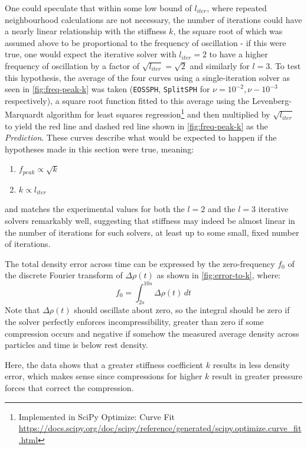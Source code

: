 One could speculate that within some low bound of $l_{iter}$, where repeated neighbourhood calculations are not necessary, the number of iterations could have a nearly linear relationship with the stiffness $k$, the square root of which was assumed above to be proportional to the frequency of oscillation - if this were true, one would expect the iterative solver with $l_{iter}=2$ to have a higher frequency of oscillation by a factor of $\sqrt{l_{iter}}=\sqrt{2}$ and similarly for $l=3$.
To test this hypothesis, the average of the four curves using a single-iteration solver as seen in \autoref{fig:freq-peak-k} was taken (\texttt{EOSSPH}, \texttt{SplitSPH} for $\nu=10^{-2}, \nu-10^{-3}$ respectively), a square root function fitted to this average using the Levenberg-Marquardt algorithm for least squares regression\footnote{Implemented in SciPy Optimize: Curve Fit \url{https://docs.scipy.org/doc/scipy/reference/generated/scipy.optimize.curve_fit.html}} and then multiplied by $\sqrt{l_{iter}}$ to yield the red line and dashed red line shown in \autoref{fig:freq-peak-k} as the \textit{Prediction}. These curves describe what would be expected to happen if the hypotheses made in this section were true, meaning:
\begin{enumerate}
  \item $f_{peak}\propto\sqrt{k}$
  \item  $k\propto l_{iter}$
\end{enumerate}
and matches the experimental values for both the $l=2$ and the $l=3$ iterative solvers remarkably well, suggesting that stiffness may indeed be almost linear in the number of iterations for such solvers, at least up to some small, fixed number of iterations.

\horizontalspacer


The total density error across time can be expressed by the zero-frequency $f_0$ of the discrete Fourier transform of $\Delta\rho (t)$ as shown in \autoref{fig:error-to-k}, where:
\begin{equation}
  f_0 = \int_{2s}^{10s} \Delta\rho (t) \,dt
\end{equation}
Note that $\Delta\rho (t)$ should oscillate about zero, so the integral should be zero if the solver perfectly enforces incompressibility, greater than zero if some compression occurs and negative if somehow the measured average density across particles and time is below rest density.

Here, the data shows that a greater stiffness coefficient $k$ results in less density error, which makes sense since compressions for higher $k$ result in greater pressure forces that correct the compression.

